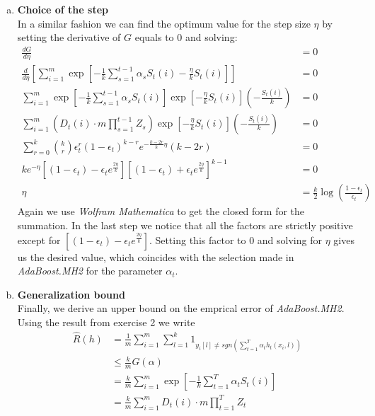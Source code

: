 \documentclass{article}
\begin{document}
\begin{enumerate}[(a)]
    \item \textbf{Choice of the step}\\
    In a similar fashion we can find the optimum value for the step size $\eta$ by setting the derivative of $G$ equals to $0$ and solving:
    \begin{align*}
        \frac{dG}{d\eta} &= 0\\
        \frac{d}{d\eta}\left[\sum_{i=1}^m\exp\left[-\frac{1}{k}\sum_{s=1}^{t-1}\alpha_sS_t(i)-\frac{\eta}{k}S_t(i)\right]\right] &= 0\\
        \sum_{i=1}^m\exp\left[-\frac{1}{k}\sum_{s=1}^{t-1}\alpha_sS_t(i)\right]\exp\left[-\frac{\eta}{k}S_t(i)\right]\left(-\frac{S_t(i)}{k}\right) &= 0\\
        \sum_{i=1}^m \left(D_t(i)\cdot m \prod_{s=1}^{t-1}Z_s\right)\exp\left[-\frac{\eta}{k}S_t(i)\right]\left(-\frac{S_t(i)}{k}\right) &= 0\\
        \sum_{r=0}^k \binom{k}{r} \epsilon_t^r (1-\epsilon_t)^{k-r} e^{-\frac{k-2r}{k}\eta}(k-2r) &= 0\\
        ke^{-\eta}\left[(1-\epsilon_t) - \epsilon_t e^{\frac{2\eta}{k}}\right]\left[(1-\epsilon_t) + \epsilon_t e^{\frac{2\eta}{k}}\right]^{k-1} &= 0\\
        \eta &= \frac{k}{2}\log\left(\frac{1-\epsilon_t}{\epsilon_t}\right)
    \end{align*}
    Again we use \emph{Wolfram Mathematica} to get the closed form for the summation. In the last step we notice that all the factors are strictly positive except for $\left[(1-\epsilon_t) - \epsilon_t e^{\frac{2\eta}{k}}\right]$. Setting this factor to $0$ and solving for $\eta$ gives us the desired value, which coincides with the selection made in \emph{AdaBoost.MH2} for the parameter $\alpha_t$.
    \item \textbf{Generalization bound}\\
    Finally, we derive an upper bound on the emprical error of \emph{AdaBoost.MH2}. Using the result from exercise 2 we write
    \begin{align*}
        \widehat{R}(h) &= \frac{1}{m}\sum_{i=1}^m \sum_{l=1}^k 1_{y_i[l]\ne sgn\left( \sum_{t=1}^T \alpha_t h_t(x_i,l)\right)}\\
        &\leq \frac{k}{m} G(\alpha)\\
        &= \frac{k}{m} \sum_{i=1}^m \exp\left[-\frac{1}{k}\sum_{t=1}^{T}\alpha_tS_t(i)\right]\\
        &= \frac{k}{m} \sum_{i=1}^m D_t(i) \cdot m \prod_{t=1}^T Z_t\\

\end{align*}
\end{enumerate}
\end{document}
